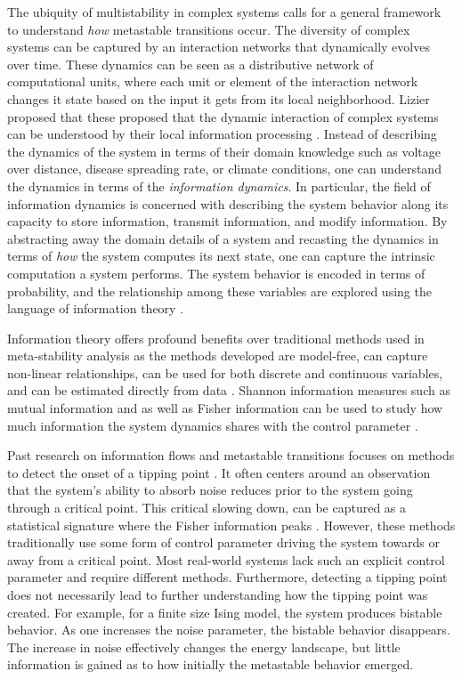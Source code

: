 \documentclass[a4paper, 11pt, twocolumn]{article}
\begin{document}
The ubiquity of multistability  in complex systems calls for
a   general  framework   to   understand  \emph{how}   metastable
transitions occur.  The diversity of complex  systems can be
captured by an interaction networks that dynamically evolves
over  time. These  dynamics can  be seen  as a  distributive
network of  computational units, where each  unit or element
of the  interaction network  changes it  state based  on the
input it  gets from its local  neighborhood. Lizier proposed
that these proposed that  the dynamic interaction of complex
systems  can  be  understood   by  their  local  information
processing \cite{Lizier2008,Lizier2013,Lizier2018}. Instead of
describing  the dynamics  of the  system in  terms of  their
domain  knowledge such  as  voltage  over distance,  disease
spreading rate,  or climate  conditions, one  can understand
the  dynamics in  terms  of the  \emph{information dynamics}.  In
particular, the  field of information dynamics  is concerned
with describing  the system  behavior along its  capacity to
store   information,   transmit  information,   and   modify
information.  By abstracting  away the  domain details  of a
system  and recasting  the dynamics  in terms  of \emph{how}  the
system  computes  its  next   state,  one  can  capture  the
intrinsic computation a system performs. The system behavior
is  encoded in  terms of  probability, and  the relationship
among  these variables  are explored  using the  language of
information theory \cite{Quax2017}.

Information theory offers profound benefits over traditional
methods  used  in  meta-stability analysis  as  the  methods
developed   are    model-free,   can    capture   non-linear
relationships, can be used  for both discrete and continuous
variables,  and   can  be   estimated  directly   from  data
\cite{Cover2005}. Shannon information  measures such as mutual
information and as well as Fisher information can be used to
study how  much information the system  dynamics shares with
the control parameter \cite{Nicolis2016,Lizier2010}.

Past   research   on   information  flows   and   metastable
transitions  focuses on  methods to  detect the  onset of  a
tipping point \cite{Scheffer2009,Prokopenko2011,Scheffer2001}.
It  often centers  around an  observation that  the system's
ability to  absorb noise reduces  prior to the  system going
through a critical point. This critical slowing down, can be
captured  as  a  statistical   signature  where  the  Fisher
information  peaks  \cite{Eason2014}. However,  these  methods
traditionally use some form of control parameter driving the
system  towards   or  away  from  a   critical  point.  Most
real-world systems  lack such an explicit  control parameter
and  require  different  methods. Furthermore,  detecting  a
tipping  point   does  not   necessarily  lead   to  further
understanding  how  the  tipping   point  was  created.  For
example, for a finite size  Ising model, the system produces
bistable behavior. As one increases the noise parameter, the
bistable   behavior  disappears.   The  increase   in  noise
effectively  changes   the  energy  landscape,   but  little
information  is gained  as to  how initially  the metastable
behavior emerged.
\end{document}
